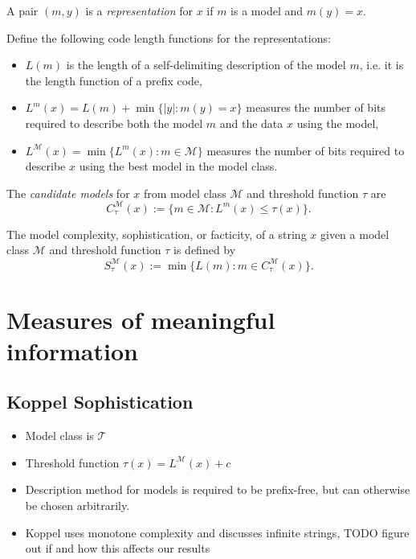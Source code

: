 \documentclass{style/llncs}
\newcommand{\M}{\mathcal M}
\newcommand{\T}{\mathcal T}
\begin{document}
\begin{definition}[Representations]
  A pair $(m,y)$ is a \emph{representation} for $x$ if $m$ is a model
  and $m(y)=x$.
\end{definition}

\begin{definition}
Define the following code length functions for the representations:
\begin{itemize}
\item $L(m)$ is the length of a self-delimiting description of
  the model $m$, i.e. it is the length function of  a prefix code,
\item $L^m(x)=L(m)+\min\{|y|:m(y)=x\}$ measures the number of bits required to describe both the model $m$ and
  the data $x$ using the model,
\item $L^\M(x)=\min\{L^m(x):m\in\M\}$ measures the number of bits
  required to describe $x$ using the best model in the model class.
\end{itemize}
\end{definition}
  
\begin{definition}
  The \emph{candidate models} for $x$ from model class $\M$ and
  threshold function $\tau$ are
  \[
  C^\M_\tau(x):=\{m\in\M:L^m(x)\le \tau(x)\}.
  \]
\end{definition}

\begin{definition}[Sophistication]
  The model complexity, sophistication, or facticity, of a string $x$
  given a model class $\M$ and threshold function $\tau$ is defined by
  \[
  S^\M_\tau(x):=\min\{L(m):m\in C^\M_\tau(x)\}.
  \]
\end{definition}

\section{Measures of meaningful information}

\subsection{Koppel Sophistication}

\begin{itemize}
\item Model class is $\T$
\item Threshold function $\tau(x)=L^\M(x)+c$
\item Description method for models is required to be prefix-free, but
  can otherwise be chosen arbitrarily.
\item Koppel uses monotone complexity and discusses infinite strings,
  TODO figure out if and how this affects our results
\end{itemize}
\end{document}

